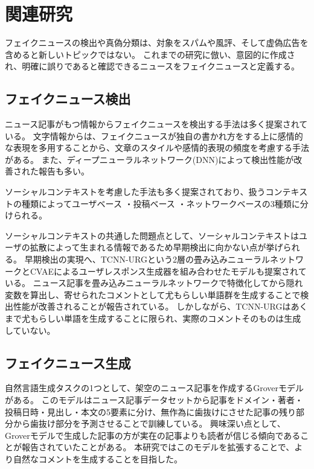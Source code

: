 \section{関連研究}
フェイクニュースの検出や真偽分類は、対象をスパム\cite{shen2017discovering}や風評\cite{7023340}、そして虚偽広告\cite{Huang:2017:DFO:3041021.3054233}を含めると新しいトピックではない。
これまでの研究\cite{Shu:2017:FND:3137597.3137600,Ruchansky:2017:CHD:3132847.3132877,Wang:2018:EEA:3219819.3219903}に倣い、意図的に作成され、明確に誤りであると確認できるニュースをフェイクニュースと定義する。

\subsection{フェイクニュース検出}
ニュース記事がもつ情報からフェイクニュースを検出する手法は多く提案されている。
文字情報からは、フェイクニュースが独自の書かれ方をする上に感情的な表現を多用することから、文章のスタイル\cite{DBLP:journals/corr/PotthastKRBS17}や感情的表現の頻度\cite{DBLP:journals/corr/abs-1903-01728}を考慮する手法がある。
また、ディープニューラルネットワーク(DNN)によって検出性能が改善された報告\cite{wang-2017-liar,karimi-tang-2019-learning,karimi-etal-2018-multi}も多い。

ソーシャルコンテキストを考慮した手法も多く提案されており、扱うコンテキストの種類によってユーザベース\cite{Castillo:2011:ICT:1963405.1963500,8397048,DBLP:journals/corr/abs-1904-13355}
・投稿ベース\cite{Yang2019UnsupervisedFN,Tacchini2017SomeLI,Jin:2016:NVE:3016100.3016318}
・ネットワークベース\cite{Wu:2018:TFF:3159652.3159677,DBLP:journals/corr/abs-1902-06673}の3種類に分けられる。

ソーシャルコンテキストの共通した問題点として、ソーシャルコンテキストはユーザの拡散によって生まれる情報であるため早期検出に向かない点が挙げられる。
早期検出の実現へ、TCNN-URGという2層の畳み込みニューラルネットワークとCVAEによるユーザレスポンス生成器を組み合わせたモデルも提案されている\cite{ijcai2018-533}。
ニュース記事を畳み込みニューラルネットワークで特徴化してから隠れ変数を算出し、寄せられたコメントとして尤もらしい単語群を生成することで検出性能が改善されることが報告されている。
しかしながら、TCNN-URGはあくまで尤もらしい単語を生成することに限られ、実際のコメントそのものは生成していない。

\subsection{フェイクニュース生成}
自然言語生成タスクの1つとして、架空のニュース記事を作成するGroverモデルがある\cite{NIPS2019_9106}。
このモデルはニュース記事データセットから記事をドメイン・著者・投稿日時・見出し・本文の5要素に分け、無作為に歯抜けにさせた記事の残り部分から歯抜け部分を予測させることで訓練している。
興味深い点として、Groverモデルで生成した記事の方が実在の記事よりも読者が信じる傾向であることが報告されていたことがある。
本研究ではこのモデルを拡張することで、より自然なコメントを生成することを目指した。
